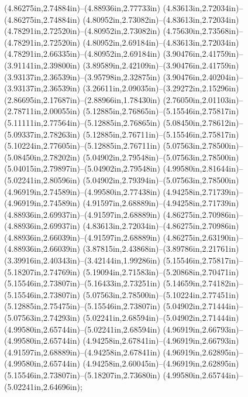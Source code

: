 (4.86275in,2.74884in)--(4.88936in,2.77733in) (4.83613in,2.72034in)--(4.86275in,2.74884in) (4.80952in,2.73082in)--(4.83613in,2.72034in) (4.78291in,2.72520in)--(4.80952in,2.73082in) (4.75630in,2.73568in)--(4.78291in,2.72520in) (4.80952in,2.69184in)--(4.83613in,2.72034in) (4.78291in,2.66335in)--(4.80952in,2.69184in) (3.90476in,2.41759in)--(3.91141in,2.39800in) (3.89589in,2.42109in)--(3.90476in,2.41759in) (3.93137in,2.36539in)--(3.95798in,2.32875in) (3.90476in,2.40204in)--(3.93137in,2.36539in) (3.26611in,2.09035in)--(3.29272in,2.15296in) (2.86695in,2.17687in)--(2.88966in,1.78430in) (2.76050in,2.01103in)--(2.78711in,2.00055in) (5.12885in,2.76865in)--(5.15546in,2.75817in) (5.11111in,2.77564in)--(5.12885in,2.76865in) (5.08450in,2.78612in)--(5.09337in,2.78263in) (5.12885in,2.76711in)--(5.15546in,2.75817in) (5.10224in,2.77605in)--(5.12885in,2.76711in) (5.07563in,2.78500in)--(5.08450in,2.78202in) (5.04902in,2.79548in)--(5.07563in,2.78500in) (5.04015in,2.79897in)--(5.04902in,2.79548in) (4.99580in,2.81644in)--(5.02241in,2.80596in) (5.04902in,2.79394in)--(5.07563in,2.78500in) (4.96919in,2.74589in)--(4.99580in,2.77438in) (4.94258in,2.71739in)--(4.96919in,2.74589in) (4.91597in,2.68889in)--(4.94258in,2.71739in) (4.88936in,2.69937in)--(4.91597in,2.68889in) (4.86275in,2.70986in)--(4.88936in,2.69937in) (4.83613in,2.72034in)--(4.86275in,2.70986in) (4.88936in,2.66039in)--(4.91597in,2.68889in) (4.86275in,2.63190in)--(4.88936in,2.66039in) (3.87815in,2.43868in)--(3.89786in,2.21761in) (3.39916in,2.40343in)--(3.42144in,1.99286in) (5.15546in,2.75817in)--(5.18207in,2.74769in) (5.19094in,2.71583in)--(5.20868in,2.70471in) (5.15546in,2.73807in)--(5.16433in,2.73251in) (5.14659in,2.74182in)--(5.15546in,2.73807in) (5.07563in,2.78500in)--(5.10224in,2.77451in) (5.12885in,2.75475in)--(5.15546in,2.73807in) (5.04902in,2.71444in)--(5.07563in,2.74293in) (5.02241in,2.68594in)--(5.04902in,2.71444in) (4.99580in,2.65744in)--(5.02241in,2.68594in) (4.96919in,2.66793in)--(4.99580in,2.65744in) (4.94258in,2.67841in)--(4.96919in,2.66793in) (4.91597in,2.68889in)--(4.94258in,2.67841in) (4.96919in,2.62895in)--(4.99580in,2.65744in) (4.94258in,2.60045in)--(4.96919in,2.62895in) (5.15546in,2.73807in)--(5.18207in,2.73680in) (4.99580in,2.65744in)--(5.02241in,2.64696in);
